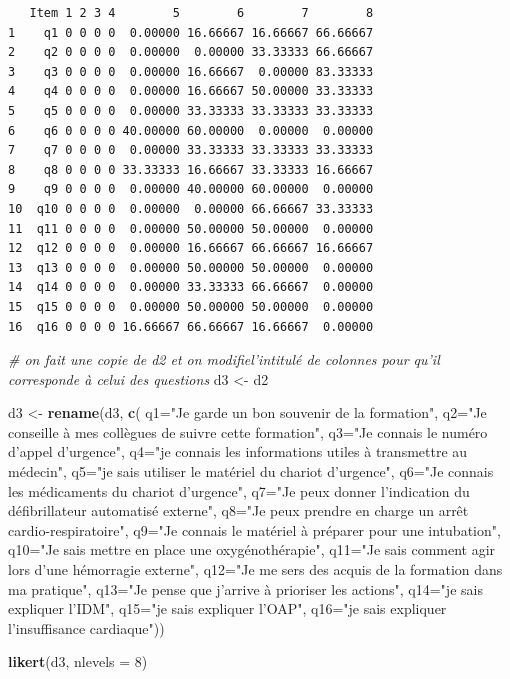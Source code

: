 \documentclass[]{article}
\newenvironment{Shaded}{\begin{snugshade}}{\end{snugshade}}
\newcommand{\KeywordTok}[1]{\textcolor[rgb]{0.13,0.29,0.53}{\textbf{{#1}}}}
\newcommand{\DataTypeTok}[1]{\textcolor[rgb]{0.13,0.29,0.53}{{#1}}}
\newcommand{\DecValTok}[1]{\textcolor[rgb]{0.00,0.00,0.81}{{#1}}}
\newcommand{\StringTok}[1]{\textcolor[rgb]{0.31,0.60,0.02}{{#1}}}
\newcommand{\CommentTok}[1]{\textcolor[rgb]{0.56,0.35,0.01}{\textit{{#1}}}}
\newcommand{\NormalTok}[1]{{#1}}
\begin{document}
\begin{verbatim}
   Item 1 2 3 4        5        6        7        8
1    q1 0 0 0 0  0.00000 16.66667 16.66667 66.66667
2    q2 0 0 0 0  0.00000  0.00000 33.33333 66.66667
3    q3 0 0 0 0  0.00000 16.66667  0.00000 83.33333
4    q4 0 0 0 0  0.00000 16.66667 50.00000 33.33333
5    q5 0 0 0 0  0.00000 33.33333 33.33333 33.33333
6    q6 0 0 0 0 40.00000 60.00000  0.00000  0.00000
7    q7 0 0 0 0  0.00000 33.33333 33.33333 33.33333
8    q8 0 0 0 0 33.33333 16.66667 33.33333 16.66667
9    q9 0 0 0 0  0.00000 40.00000 60.00000  0.00000
10  q10 0 0 0 0  0.00000  0.00000 66.66667 33.33333
11  q11 0 0 0 0  0.00000 50.00000 50.00000  0.00000
12  q12 0 0 0 0  0.00000 16.66667 66.66667 16.66667
13  q13 0 0 0 0  0.00000 50.00000 50.00000  0.00000
14  q14 0 0 0 0  0.00000 33.33333 66.66667  0.00000
15  q15 0 0 0 0  0.00000 50.00000 50.00000  0.00000
16  q16 0 0 0 0 16.66667 66.66667 16.66667  0.00000
\end{verbatim}

\begin{Shaded}
\begin{Highlighting}[]
\CommentTok{# on fait une copie de d2 et on modifiel'intitulé de colonnes pour qu'il corresponde à celui des questions}
\NormalTok{d3 <-}\StringTok{ }\NormalTok{d2}

\NormalTok{d3 <-}\StringTok{ }\KeywordTok{rename}\NormalTok{(d3, }\KeywordTok{c}\NormalTok{(}
    \DataTypeTok{q1=}\StringTok{"Je garde un bon souvenir de la formation"}\NormalTok{, }
    \DataTypeTok{q2=}\StringTok{"Je conseille à mes collègues de suivre cette formation"}\NormalTok{, }
    \DataTypeTok{q3=}\StringTok{"Je connais le numéro d’appel d’urgence"}\NormalTok{, }
    \DataTypeTok{q4=}\StringTok{"je connais les informations utiles à transmettre au médecin"}\NormalTok{, }
    \DataTypeTok{q5=}\StringTok{"je sais utiliser le matériel du chariot d’urgence"}\NormalTok{, }
    \DataTypeTok{q6=}\StringTok{"Je connais les médicaments du chariot d’urgence"}\NormalTok{, }
    \DataTypeTok{q7=}\StringTok{"Je peux donner l’indication du défibrillateur automatisé externe"}\NormalTok{, }
    \DataTypeTok{q8=}\StringTok{"Je peux prendre en charge un arrêt cardio-respiratoire"}\NormalTok{, }
    \DataTypeTok{q9=}\StringTok{"Je connais le matériel à préparer pour une intubation"}\NormalTok{, }
    \DataTypeTok{q10=}\StringTok{"Je sais mettre en place une oxygénothérapie"}\NormalTok{, }
    \DataTypeTok{q11=}\StringTok{"Je sais comment agir lors d’une hémorragie externe"}\NormalTok{, }
    \DataTypeTok{q12=}\StringTok{"Je me sers des acquis de la formation dans ma pratique"}\NormalTok{, }
    \DataTypeTok{q13=}\StringTok{"Je pense que j’arrive à prioriser les actions"}\NormalTok{, }
    \DataTypeTok{q14=}\StringTok{"je sais expliquer l'IDM"}\NormalTok{, }
    \DataTypeTok{q15=}\StringTok{"je sais expliquer l'OAP"}\NormalTok{, }
    \DataTypeTok{q16=}\StringTok{"je sais expliquer l'insuffisance cardiaque"}\NormalTok{))}

\KeywordTok{likert}\NormalTok{(d3, }\DataTypeTok{nlevels =} \DecValTok{8}\NormalTok{)}
\end{Highlighting}
\end{Shaded}
\end{document}
